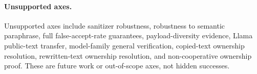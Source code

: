 \paragraph{Unsupported axes.}
Unsupported axes include sanitizer robustness, robustness to semantic
paraphrase, full false-accept-rate guarantees, payload-diversity evidence,
Llama public-text transfer, model-family general verification, copied-text
ownership resolution, rewritten-text ownership resolution, and non-cooperative
ownership proof.  These are future work or out-of-scope axes, not hidden
successes.
